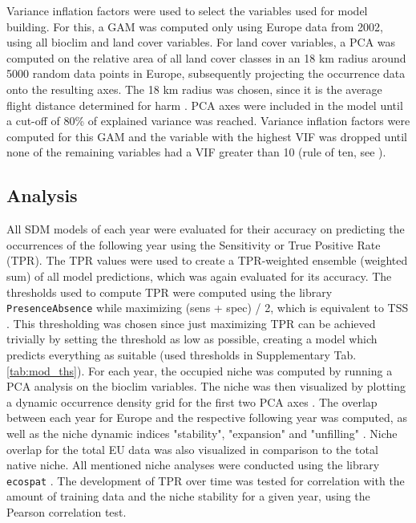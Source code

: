 \documentclass[12pt,a4paper]{article}
\begin{document}
Variance inflation factors were used to select the variables used for model building.
For this, a GAM was computed only using Europe data from 2002, using all bioclim and land cover variables.
For land cover variables, a PCA was computed on the relative area of all land cover classes in an 18 km radius around 5000 random data points in Europe, subsequently projecting the occurrence data onto the resulting axes.
The 18 km radius was chosen, since it is the average flight distance determined for \gls{harm} \autocite{jeffries2013flightharmonia}.
PCA axes were included in the model until a cut-off of 80\% of explained variance was reached.
Variance inflation factors were computed for this GAM and the variable with the highest VIF was dropped until none of the remaining variables had a VIF greater than 10 (rule of ten, see \autocite{obrien2007cautionVIFs}).

\subsection{Analysis} \label{ssec:analysis}
All SDM models of each year were evaluated for their accuracy on predicting the occurrences of the following year using the Sensitivity or True Positive Rate (TPR).
The TPR values were used to create a TPR-weighted ensemble (weighted sum) of all model predictions, which was again evaluated for its accuracy.
The thresholds used to compute TPR were computed using the library \texttt{PresenceAbsence} \autocite{freeman2008presenceabsence} while maximizing (sens + spec) / 2, which is equivalent to TSS \autocite{allouche2006TSS}.
This thresholding was chosen since just maximizing TPR can be achieved trivially by setting the threshold as low as possible, creating a model which predicts everything as suitable (used thresholds in Supplementary Tab. \ref{tab:mod_ths}).
For each year, the occupied niche was computed by running a PCA analysis on the bioclim variables.
The niche was then visualized by plotting a dynamic occurrence density grid for the first two PCA axes \autocite{broennimann2012niche}.
The overlap between each year for Europe and the respective following year was computed, as well as the niche dynamic indices "stability", "expansion" and "unfilling" \autocite{guisan2014nichedyn}.
Niche overlap for the total EU data was also visualized in comparison to the total native niche.
All mentioned niche analyses were conducted using the library \texttt{ecospat} \autocite{dicola2017ecospat}.
The development of TPR over time was tested for correlation with the amount of training data and the niche stability for a given year, using the Pearson correlation test.
\end{document}
